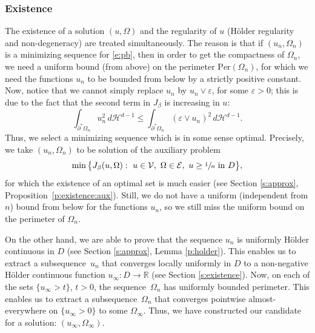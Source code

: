 \documentclass[JEP,XML,SOM,Unicode]{cedram}
\newcommand{\Per}{\mathrm{Per}}
\theoremstyle{plain}
\theoremstyle{definition}
\let\ds\displaystyle
\let\eps\varepsilon
\def\R{\mathbb{R}}
\def\HH{\mathcal{H}}
\begin{document}
\subsubsection{Existence}The existence of a solution $(u,\Omega)$ and the regularity of $u$ (Hölder regularity and non-degeneracy) are treated simultaneously. The reason is that if $(u_n,\Omega_n)$ is a minimizing sequence for \eqref{e:pb}, then in order to get the compactness of $\Omega_n$, we need a uniform bound (from above) on the perimeter $\Per(\Omega_n)$, for which we need the functions $u_n$ to be bounded from below by a strictly positive constant. Now, notice that we cannot simply replace $u_n$ by $u_n\vee \eps$, for some $\eps>0$; this is due to the fact that the second term in $J_\beta$ is increasing in $u$: \[\ds\int_{\partial^\ast\Omega_n}u_n^2\,d\HH^{d-1}\le \int_{\partial^\ast\Omega_n}(\eps\vee u_n)^2\,d\HH^{d-1}.\]
Thus, we select a minimizing sequence which is in some sense optimal. Precisely, we take $(u_n,\Omega_n)$ to be solution of the auxiliary problem
\begin{equation}\label{e:pb_approx_intro}
\min\big\{J_\beta(u,\Omega):\ u\in\mathcal V,\ \Omega\in\mathcal E,\ u\ge \sfrac1n\ \text{in}\ D\big\},
\end{equation}
for which the existence of an optimal set is much easier (see Section \ref{s:approx}, Proposition~\ref{p:existence:aux}). Still, we do not have a uniform (independent from $n$) bound from below for the functions $u_n$, so we still miss the uniform bound on the perimeter of $\Omega_n$.

On the other hand, we are able to prove that the sequence $u_n$ is uniformly Hölder continuous in $D$ (see Section \ref{s:approx}, Lemma \ref{p:holder}). This enables us to extract a subsequence~$u_n$ that converges locally uniformly in $D$ to a non-negative Hölder continuous function $u_\infty:D\to\R$ (see Section \ref{s:existence}). Now, on each of the sets $\{u_\infty>t\}$, $t>0$, the sequence~$\Omega_n$ has uniformly bounded perimeter. This enables us to extract a subsequence~$\Omega_n$ that converges pointwise almost-everywhere on $\{u_\infty>0\}$ to some $\Omega_\infty$. Thus, we have constructed our candidate for a solution: $(u_\infty,\Omega_\infty)$.
\end{document}
